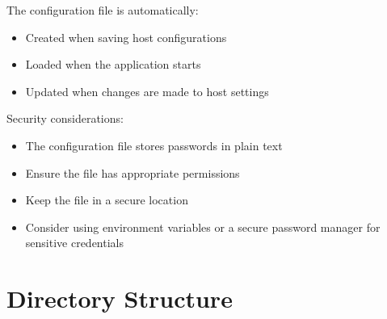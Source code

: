 \documentclass[a4paper,11pt]{report}
\begin{document}
\begin{notebox}
The configuration file is automatically:
\begin{itemize}
    \item Created when saving host configurations
    \item Loaded when the application starts
    \item Updated when changes are made to host settings
\end{itemize}
\end{notebox}

\begin{warningbox}
Security considerations:
\begin{itemize}
    \item The configuration file stores passwords in plain text
    \item Ensure the file has appropriate permissions
    \item Keep the file in a secure location
    \item Consider using environment variables or a secure password manager for sensitive credentials
\end{itemize}
\end{warningbox}

\section{Directory Structure}
\end{document}
